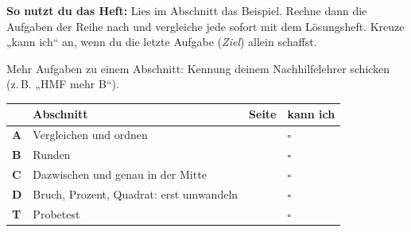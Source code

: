 \documentclass[11pt]{article}
\begin{document}
\par\smallskip
{}\par\medskip
\noindent\textbf{So nutzt du das Heft:} Lies im Abschnitt das Beispiel. Rechne dann die Aufgaben der Reihe nach und vergleiche jede sofort mit dem Lösungsheft. Kreuze „kann ich“ an, wenn du die letzte Aufgabe (\emph{Ziel}) allein schaffst.\par
\noindent Mehr Aufgaben zu einem Abschnitt: Kennung deinem Nachhilfelehrer schicken (z.\,B. „HMF mehr B“).\par\medskip
{\renewcommand{\arraystretch}{1.3}
\noindent\begin{tabular}{|>{\bfseries}p{10mm}|p{112mm}|>{\raggedleft\arraybackslash}p{10mm}|>{\centering\arraybackslash}p{14mm}|}\hline
\rowcolor{black!8} & \textbf{Abschnitt} & \textbf{Seite} & \textbf{kann ich}\\\hline
A & Vergleichen und ordnen & \pageref{s:A} & $\square$\\\hline
B & Runden & \pageref{s:B} & $\square$\\\hline
C & Dazwischen und genau in der Mitte & \pageref{s:C} & $\square$\\\hline
D & Bruch, Prozent, Quadrat: erst umwandeln & \pageref{s:D} & $\square$\\\hline
T & Probetest & \pageref{s:T} & $\square$\\\hline
\end{tabular}}\par\bigskip
\end{document}
